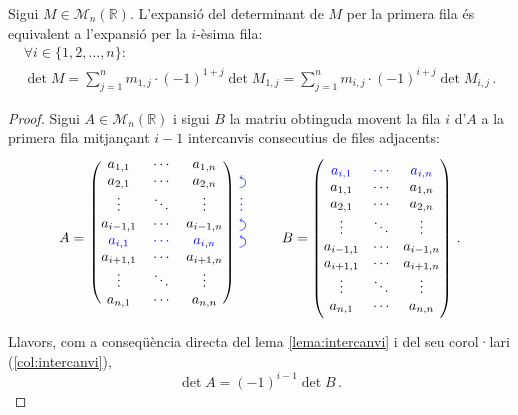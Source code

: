\begin{lema}\label{lema:iesimafila}
	Sigui $M\in\mathcal{M}_n(\mathbb{R})$. L'expansió del determinant de $M$ per la primera fila és equivalent a l'expansió per la $i$-èsima fila:
	\begin{multline*}
		\forall i \in \{1,2,\ldots, n\}:\\
		\det M = \sum_{j=1}^{n} m_{1,j}\cdot(-1)^{1+j}\det M_{1,j} = \sum_{j=1}^{n} m_{i,j}\cdot(-1)^{i+j}\det M_{i,j}\,.
	\end{multline*}
	\begin{proof}
		Sigui $A\in\mathcal{M}_n(\mathbb{R})$ i sigui $B$ la matriu obtinguda movent la fila $i$ d'$A$ a la primera fila mitjançant $i-1$ intercanvis consecutius de files adjacents:
		\[
			A =\
			\begin{blockarray}{cccc}
				\begin{block}{(ccc)*{1}{>{\color{blue}}l<{}}}
					a_{1,1}&	\cdots&		a_{1,n}& 		\\
					a_{2,1}&	\cdots&		a_{2,n}& 		\ucarr\\
					\vdots&		\ddots&		\vdots& 		\vdots\\
					a_{i-1,1}&	\cdots&		a_{i-1,n}&    	\ucarr \\
					\bl a_{i,1}&\bl\cdots&	\bl a_{i,n}&    \ucarr \\
					a_{i+1,1}&	\cdots&		a_{i+1,n}&    	\\
					\vdots&		\ddots&		\vdots& 		\\
					a_{n,1}&	\cdots&		a_{n,n}& 		\\	
				\end{block}
			\end{blockarray}
			\qquad
			B =
			\begin{pmatrix}
				\bl a_{i,1} & \bl\cdots & \bl a_{i,n} \\
				a_{1,1}     & \cdots    & a_{1,n}     \\
				a_{2,1}     & \cdots    & a_{2,n}     \\
				\vdots      & \ddots    & \vdots      \\
				a_{i-1,1}   & \cdots    & a_{i-1,n}   \\
				a_{i+1,1}   & \cdots    & a_{i+1,n}   \\
				\vdots      & \ddots    & \vdots      \\
				a_{n,1}     & \cdots    & a_{n,n}     \\
			\end{pmatrix}\,.
		\]
		Llavors, com a conseqüència directa del lema \ref{lema:intercanvi} i del seu corol·lari (\ref{col:intercanvi}), 
		\begin{equation}\label{eq:detrel}
			\det A = (-1)^{i-1}\det B\,.
		\end{equation}
		

\end{proof}
\end{lema}
